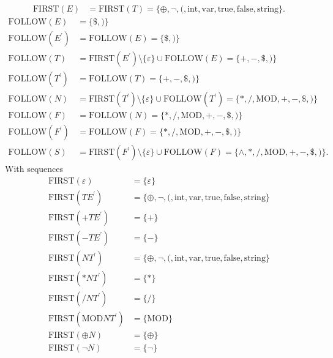 \documentclass{report}
\begin{document}
\begin{itemize}
\begin{align*}
                \text{FIRST}(E) &=\text{FIRST}(T) = \{\oplus,\neg,(, \text{int}, \text{var}, \text{true}, \text{false}, \text{string}\}
            .\end{align*}
            \begin{align*}
                \text{FOLLOW}(E) &= \{\$, )\}\\
                \text{FOLLOW}(E^{\prime}) &= \text{FOLLOW}(E) = \{\$, )\}\\
                \text{FOLLOW}(T) &= \text{FIRST}(E^{\prime}) \setminus \{\varepsilon\} \cup \text{FOLLOW}(E) = \{+,-,\$, )\}\\
                \text{FOLLOW}(T^{\prime}) &= \text{FOLLOW}(T) = \{+,-,\$,)\}\\
                \text{FOLLOW}(N) &= \text{FIRST}(T^{\prime}) \setminus \{\varepsilon\} \cup \text{FOLLOW}(T^{\prime}) = \{*, /, \text{MOD}, +, -, \$, )\}\\
                \text{FOLLOW}(F) &= \text{FOLLOW}(N) = \{*, /, \text{MOD}, +, -, \$, )\}\\
                \text{FOLLOW}(F^{\prime}) &= \text{FOLLOW}(F) = \{*, /, \text{MOD}, +, -, \$, )\}\\
                \text{FOLLOW}(S) &= \text{FIRST}(F^{\prime}) \setminus \{\varepsilon\} \cup \text{FOLLOW}(F) = \{\land, *, /, \text{MOD}, +, -, \$, )\}
            .\end{align*}
            With sequences
            \begin{align*}
                \text{FIRST}(\varepsilon) &= \{\varepsilon\}\\
                \text{FIRST}(TE^{\prime}) &= \{\oplus,\neg,(, \text{int}, \text{var}, \text{true}, \text{false}, \text{string}\}\\
                \text{FIRST}(+TE^{\prime}) &= \{+\}\\
                \text{FIRST}(-TE^{\prime}) &= \{-\}\\
                \text{FIRST}(NT^{\prime}) &= \{\oplus,\neg,(, \text{int}, \text{var}, \text{true}, \text{false}, \text{string}\}\\
                \text{FIRST}(*NT^{\prime}) &= \{*\}\\
                \text{FIRST}(/NT^{\prime}) &= \{/\}\\
                \text{FIRST}(\text{MOD}NT^{\prime}) &= \{\text{MOD}\}\\
                \text{FIRST}(\oplus N) &= \{\oplus\}\\
                \text{FIRST}(\neg N) &= \{\neg\} \\

\end{align*}
\end{itemize}
\end{document}
